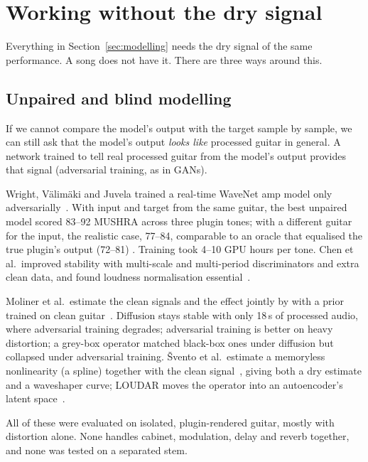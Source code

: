 \section{Working without the dry signal}
\label{sec:nodi}

Everything in Section~\ref{sec:modelling} needs the dry signal of the same
performance. A song does not have it. There are three ways around this.

\subsection{Unpaired and blind modelling}

\begin{keyidea}
If we cannot compare the model's output with the target sample by sample, we
can still ask that the model's output \emph{looks like} processed guitar in
general. A  network trained to tell real processed guitar
from the model's output provides that signal (adversarial training, as in GANs).
\end{keyidea}

Wright, Välimäki and Juvela trained a real-time WaveNet amp model only
adversarially~\cite{wright2023adversarial}. With input and target from the same
guitar, the best unpaired model scored 83--92 MUSHRA across three plugin tones;
with a different guitar for the input, the realistic case, 77--84, comparable to
an oracle that equalised the true plugin's output (72--81) \reported. Training
took 4--10 GPU hours per tone. Chen et al.\ improved stability with multi-scale
and multi-period discriminators and extra clean data, and found loudness
normalisation essential~\cite{chen2024unsupervised}.

Moliner et al.\ estimate the clean signals and the effect jointly by
 with a prior trained on clean
guitar~\cite{moliner2025unsupervised}. Diffusion stays stable with only 18\,s of
processed audio, where adversarial training degrades; adversarial training is
better on heavy distortion; a grey-box operator matched black-box ones under
diffusion but collapsed under adversarial training. Švento et al.\ estimate a
memoryless nonlinearity (a spline) together with the clean
signal~\cite{svento2025estimation}, giving both a dry estimate and a waveshaper
curve; LOUDAR moves the operator into an autoencoder's latent
space~\cite{svento2026loudar}.

All of these were evaluated on isolated, plugin-rendered guitar, mostly with
distortion alone. None handles cabinet, modulation, delay and reverb together,
and none was tested on a separated stem.

